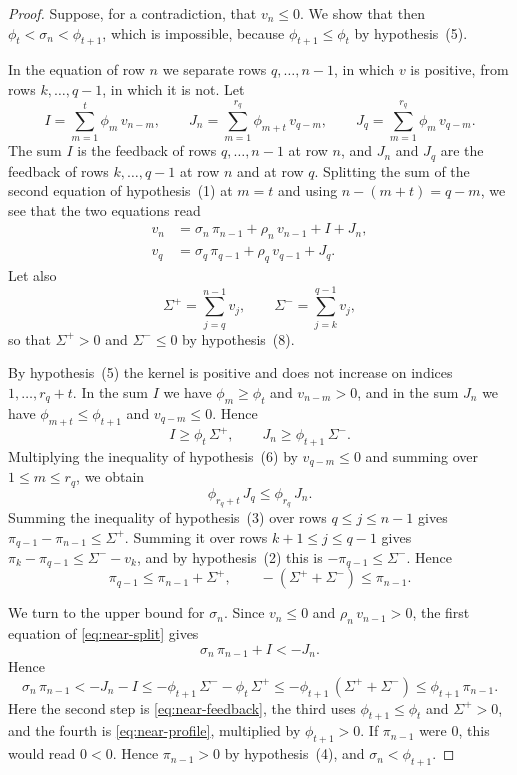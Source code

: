 \documentclass{amsart}
\theoremstyle{definition}
\theoremstyle{remark}
\numberwithin{equation}{section}
\begin{document}
\begin{proof}
Suppose, for a contradiction, that $v_n\le0$. We show that then
$\phi_t<\sigma_n<\phi_{t+1}$, which is impossible, because
$\phi_{t+1}\le\phi_t$ by hypothesis~(5).

In the equation of row $n$ we separate rows $q,\dots,n-1$, in which
$v$ is positive, from rows $k,\dots,q-1$, in which it is not. Let
\[
I=\sum_{m=1}^{t}\phi_m\,v_{n-m},\qquad
J_n=\sum_{m=1}^{r_q}\phi_{m+t}\,v_{q-m},\qquad
J_q=\sum_{m=1}^{r_q}\phi_m\,v_{q-m} .
\]
The sum $I$ is the feedback of rows $q,\dots,n-1$ at row $n$, and
$J_n$ and $J_q$ are the feedback of rows $k,\dots,q-1$ at row $n$
and at row $q$. Splitting the sum of the second equation of
hypothesis~(1) at $m=t$ and using $n-(m+t)=q-m$, we see that the two
equations read
\begin{equation}\label{eq:near-split}
\begin{split}
v_n&=\sigma_n\,\pi_{n-1}+\rho_n\,v_{n-1}+I+J_n ,\\
v_q&=\sigma_q\,\pi_{q-1}+\rho_q\,v_{q-1}+J_q .
\end{split}
\end{equation}
Let also
\[
\Sigma^{+}=\sum_{j=q}^{n-1}v_j,\qquad\Sigma^{-}=\sum_{j=k}^{q-1}v_j ,
\]
so that $\Sigma^{+}>0$ and $\Sigma^{-}\le0$ by hypothesis~(8).

By hypothesis~(5) the kernel is positive and does not increase on indices
$1,\dots,r_q+t$. In the sum $I$ we have $\phi_m\ge\phi_t$ and
$v_{n-m}>0$, and in the sum $J_n$ we have $\phi_{m+t}\le\phi_{t+1}$ and
$v_{q-m}\le0$. Hence
\begin{equation}\label{eq:near-feedback}
I\ge\phi_t\,\Sigma^{+},\qquad J_n\ge\phi_{t+1}\,\Sigma^{-} .
\end{equation}
Multiplying the inequality of hypothesis~(6) by $v_{q-m}\le0$ and summing
over $1\le m\le r_q$, we obtain
\begin{equation}\label{eq:near-transfer}
\phi_{r_q+t}\,J_q\le\phi_{r_q}\,J_n .
\end{equation}
Summing the inequality of hypothesis~(3) over rows $q\le j\le n-1$ gives
$\pi_{q-1}-\pi_{n-1}\le\Sigma^{+}$. Summing it over rows
$k+1\le j\le q-1$ gives $\pi_k-\pi_{q-1}\le\Sigma^{-}-v_k$, and by
hypothesis~(2) this is $-\pi_{q-1}\le\Sigma^{-}$. Hence
\begin{equation}\label{eq:near-profile}
\pi_{q-1}\le\pi_{n-1}+\Sigma^{+},\qquad
-(\Sigma^{+}+\Sigma^{-})\le\pi_{n-1} .
\end{equation}

We turn to the upper bound for $\sigma_n$. Since $v_n\le0$ and
$\rho_n\,v_{n-1}>0$, the first equation of \eqref{eq:near-split} gives
\begin{equation}\label{eq:near-debt}
\sigma_n\,\pi_{n-1}+I<-J_n .
\end{equation}
Hence
\[
\sigma_n\,\pi_{n-1}<-J_n-I
\le-\phi_{t+1}\,\Sigma^{-}-\phi_t\,\Sigma^{+}
\le-\phi_{t+1}\,(\Sigma^{+}+\Sigma^{-})
\le\phi_{t+1}\,\pi_{n-1} .
\]
Here the second step is \eqref{eq:near-feedback}, the third uses
$\phi_{t+1}\le\phi_t$ and $\Sigma^{+}>0$, and the fourth is
\eqref{eq:near-profile}, multiplied by $\phi_{t+1}>0$. If $\pi_{n-1}$ were
$0$, this would read $0<0$. Hence $\pi_{n-1}>0$ by hypothesis~(4), and
$\sigma_n<\phi_{t+1}$.


\end{proof}
\end{document}

